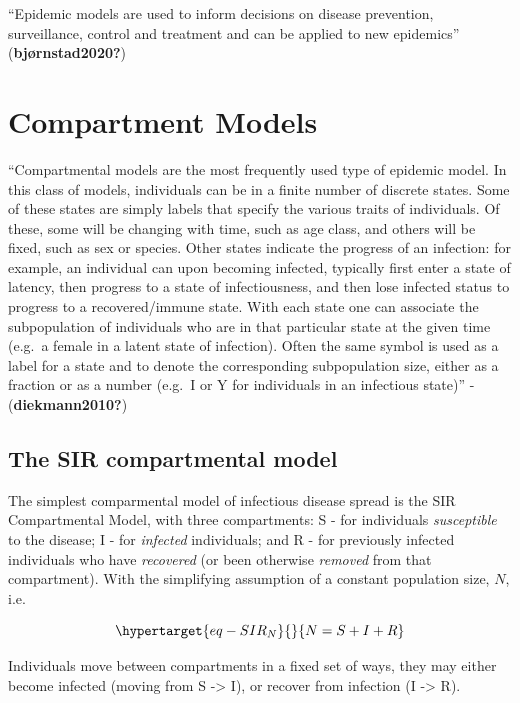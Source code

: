 \documentclass[
  letterpaper,
  DIV=11,
  numbers=noendperiod]{scrreprt}
\begin{document}
``Epidemic models are used to inform decisions on disease prevention,
surveillance, control and treatment and can be applied to new
epidemics'' (\textbf{bjørnstad2020?})

\hypertarget{compartment-models}{%
\section{Compartment Models}\label{compartment-models}}

``Compartmental models are the most frequently used type of epidemic
model. In this class of models, individuals can be in a finite number of
discrete states. Some of these states are simply labels that specify the
various traits of individuals. Of these, some will be changing with
time, such as age class, and others will be fixed, such as sex or
species. Other states indicate the progress of an infection: for
example, an individual can upon becoming infected, typically first enter
a state of latency, then progress to a state of infectiousness, and then
lose infected status to progress to a recovered/immune state. With each
state one can associate the subpopulation of individuals who are in that
particular state at the given time (e.g.~a female in a latent state of
infection). Often the same symbol is used as a label for a state and to
denote the corresponding subpopulation size, either as a fraction or as
a number (e.g.~I or Y for individuals in an infectious state)'' -
(\textbf{diekmann2010?})

\hypertarget{the-sir-compartmental-model}{%
\subsection{The SIR compartmental
model}\label{the-sir-compartmental-model}}

The simplest comparmental model of infectious disease spread is the SIR
Compartmental Model, with three compartments: S - for individuals
\emph{susceptible} to the disease; I - for \emph{infected} individuals;
and R - for previously infected individuals who have \emph{recovered}
(or been otherwise \emph{removed} from that compartment). With the
simplifying assumption of a constant population size, \(N\), i.e.

\begin{equation}\protect\hypertarget{eq-SIR_N}{}{
N = S + I + R
}\label{eq-SIR_N}\end{equation}

Individuals move between compartments in a fixed set of ways, they may
either become infected (moving from S -\textgreater{} I), or recover
from infection (I -\textgreater{} R).
\end{document}
